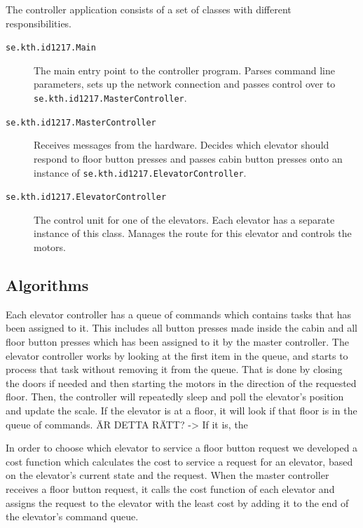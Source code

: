 \documentclass[a4paper]{article}
\begin{document}
The controller application consists of a set of classes with different
responsibilities.

\begin{description}

\item[\texttt{se.kth.id1217.Main}] The main entry point to the controller
    program. Parses command line parameters, sets up the network connection and
    passes control over to \texttt{se.kth.id1217.MasterController}.

\item[\texttt{se.kth.id1217.MasterController}] Receives messages from the
    hardware. Decides which elevator should respond to floor button presses and
    passes cabin button presses onto an instance of
    \texttt{se.kth.id1217.ElevatorController}.

\item[\texttt{se.kth.id1217.ElevatorController}] The control unit for one of the
    elevators. Each elevator has a separate instance of this class. Manages the
    route for this elevator and controls the motors.

\end{description}

\subsection{Algorithms}


Each elevator controller has a queue of commands which contains tasks that has been assigned to it. This includes all button presses made inside the cabin and all floor button presses which has been assigned to it by the master controller. The elevator controller works by looking at the first item in the queue, and starts to process that task without removing it from the queue. That is done by closing the doors if needed and then starting the motors in the direction of the requested floor. Then, the controller will repeatedly sleep and poll the elevator's position and update the scale. If the elevator is at a floor, it will look if that floor is in the queue of commands. ÄR DETTA RÄTT? -> If it is, the 


In order to choose which elevator to service a floor button request we developed a cost function which calculates the cost to service a request for an elevator, based on the elevator's current state and the request. When the master controller receives a floor button request, it calls the cost function of each elevator and assigns the request to the elevator with the least cost by adding it to the end of the elevator's command queue.
\end{document}
